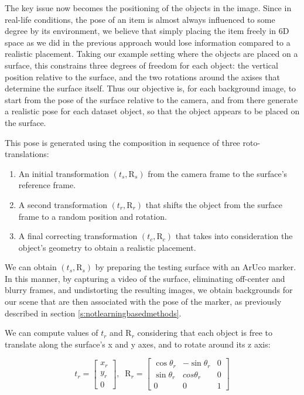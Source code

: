 The key issue now becomes the positioning of the objects in the image. Since in real-life conditions, the pose of an item is almost always influenced to some degree by its environment, we believe that simply placing the item freely in 6D space as we did in the previous approach would lose information compared to a realistic placement. Taking our example setting where the objects are placed on a surface, this constrains three degrees of freedom for each object: the vertical position relative to the surface, and the two rotations around the axises that determine the surface itself. Thus our objective is, for each background image, to start from the pose of the surface relative to the camera, and from there generate a realistic pose for each dataset object, so that the object appears to be placed on the surface.

This pose is generated using the composition in sequence of three roto-translations:

\begin{enumerate}
    \item An initial transformation $(t_s, \text{R}_s)$ from the camera frame to the surface's reference frame.
    \item A second transformation $(t_r, \text{R}_r)$ that shifts the object from the surface frame to a random position and rotation.
    \item A final correcting transformation $(t_c, \text{R}_c)$ that takes into consideration the object's geometry to obtain a realistic placement.
\end{enumerate}

We can obtain $(t_s, \text{R}_s)$ by preparing the testing surface with an ArUco marker. In this manner, by capturing a video of the surface, eliminating off-center and blurry frames, and undistorting the resulting images, we obtain backgrounds for our scene that are then associated with the pose of the marker, as previously described in section \ref*{s:notlearningbasedmethods}.

We can compute values of $t_r$ and $\text{R}_r$ considering that each object is free to translate along the surface's x and y axes, and to rotate around its z axis:

\begin{equation}
    t_r = 
    \begin{bmatrix}
        x_r\\y_r\\0
    \end{bmatrix}
    ,\; \; \text{R}_r =
    \begin{bmatrix}
        \cos \theta_r & - \sin \theta_r & 0 \\
        \sin \theta_r & cos \theta_r & 0 \\
        0 & 0 & 1
    \end{bmatrix}
    \label{eq:translationsurface}
\end{equation}

